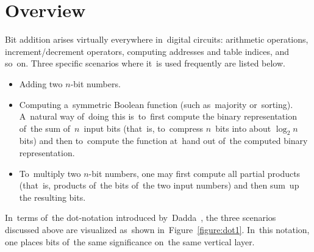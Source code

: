 \documentclass[a4paper, UKenglish, cleveref, autoref,  thm-restate]{lipics-v2021}
\begin{document}
    \section{Overview}
    Bit addition arises virtually everywhere in~digital circuits:
    arithmetic operations,
    increment/decrement operators,
    computing addresses and table indices, and so~on.
    Three specific scenarios where it~is used frequently are listed below.
    \begin{itemize}
        \item Adding two $n$-bit numbers.
        \item Computing a~symmetric Boolean function
        (such as~majority or~sorting).
        A~natural way of~doing this is~to~first compute
        the binary representation of~the sum of~$n$~input bits
        (that~is, to~compress $n$~bits into about $\log_2 n$ bits)
        and then to~compute the function at~hand
        out of~the computed binary representation.
        \item To~multiply two $n$-bit numbers, one may first compute
        all partial products (that~is, products of~the bits of~the
        two input numbers) and then sum~up the resulting bits.
    \end{itemize}
    In~terms of~the dot-notation introduced by~Dadda~\cite{dadda}, the three scenarios discussed above are visualized as~shown in~Figure~\ref{figure:dot1}. In~this notation, one places
    bits of~the same significance on~the same vertical layer.
\end{document}
